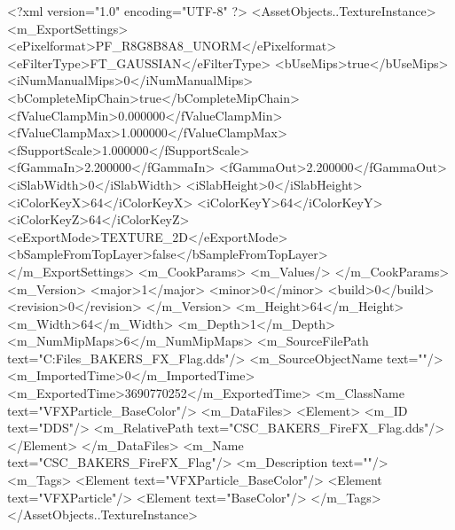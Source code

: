 <?xml version="1.0" encoding="UTF-8" ?>
<AssetObjects..TextureInstance>
	<m_ExportSettings>
		<ePixelformat>PF_R8G8B8A8_UNORM</ePixelformat>
		<eFilterType>FT_GAUSSIAN</eFilterType>
		<bUseMips>true</bUseMips>
		<iNumManualMips>0</iNumManualMips>
		<bCompleteMipChain>true</bCompleteMipChain>
		<fValueClampMin>0.000000</fValueClampMin>
		<fValueClampMax>1.000000</fValueClampMax>
		<fSupportScale>1.000000</fSupportScale>
		<fGammaIn>2.200000</fGammaIn>
		<fGammaOut>2.200000</fGammaOut>
		<iSlabWidth>0</iSlabWidth>
		<iSlabHeight>0</iSlabHeight>
		<iColorKeyX>64</iColorKeyX>
		<iColorKeyY>64</iColorKeyY>
		<iColorKeyZ>64</iColorKeyZ>
		<eExportMode>TEXTURE_2D</eExportMode>
		<bSampleFromTopLayer>false</bSampleFromTopLayer>
	</m_ExportSettings>
	<m_CookParams>
		<m_Values/>
	</m_CookParams>
	<m_Version>
		<major>1</major>
		<minor>0</minor>
		<build>0</build>
		<revision>0</revision>
	</m_Version>
	<m_Height>64</m_Height>
	<m_Width>64</m_Width>
	<m_Depth>1</m_Depth>
	<m_NumMipMaps>6</m_NumMipMaps>
	<m_SourceFilePath text="C:\Users\Shadow\Desktop\Working Files\Textures\CSC_BAKERS_FX_Flag.dds"/>
	<m_SourceObjectName text=""/>
	<m_ImportedTime>0</m_ImportedTime>
	<m_ExportedTime>3690770252</m_ExportedTime>
	<m_ClassName text="VFXParticle_BaseColor"/>
	<m_DataFiles>
		<Element>
			<m_ID text="DDS"/>
			<m_RelativePath text="CSC_BAKERS_FireFX_Flag.dds"/>
		</Element>
	</m_DataFiles>
	<m_Name text="CSC_BAKERS_FireFX_Flag"/>
	<m_Description text=""/>
	<m_Tags>
		<Element text="VFXParticle_BaseColor"/>
		<Element text="VFXParticle"/>
		<Element text="BaseColor"/>
	</m_Tags>
</AssetObjects..TextureInstance>

